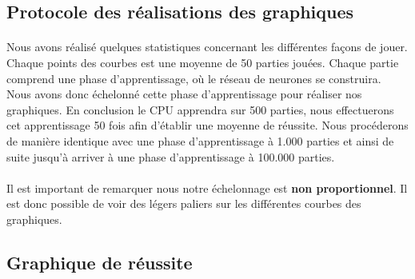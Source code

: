 \documentclass{article}
\begin{document}
  \subsection{Protocole des réalisations des graphiques}
  \paragraph{}
    Nous avons réalisé quelques statistiques concernant les différentes façons de jouer.
    Chaque points des courbes est une moyenne de 50 parties jouées. Chaque partie comprend une phase d'apprentissage,
    où le réseau de neurones se construira. Nous avons donc échelonné cette phase d'apprentissage pour réaliser nos graphiques.
    En conclusion le CPU apprendra sur 500 parties, nous effectuerons cet apprentissage 50 fois afin d'établir une moyenne de réussite.
    Nous procéderons de manière identique avec une phase d'apprentissage à 1.000 parties et ainsi de suite jusqu'à arriver à une phase d'apprentissage à 100.000 parties.
  \paragraph{}
    Il est important de remarquer nous notre échelonnage est \textbf{non proportionnel}. Il est donc possible de voir
    des légers paliers sur les différentes courbes des graphiques.
  
  \subsection{Graphique de réussite}
\end{document}
